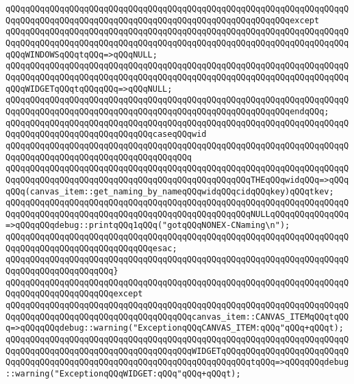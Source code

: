 \verb|qQQqqQQqqQQqqQQqqQQqqQQqqQQqqQQqqQQqqQQqqQQqqQQqqQQqqQQqqQQqqQQqqQQqqQQqqQQqqQQqqQQqqQQqqQQqqQQqqQQqqQQqqQQqqQQqqQQqqQQqqQQqqQQqexcept|\newline
\verb|qQQqqQQqqQQqqQQqqQQqqQQqqQQqqQQqqQQqqQQqqQQqqQQqqQQqqQQqqQQqqQQqqQQqqQQqqQQqqQQqqQQqqQQqqQQqqQQqqQQqqQQqqQQqqQQqqQQqqQQqqQQqqQQqqQQqqQQqqQQqqQQqWINDOWSqQQqtqQQq=>qQQqNULL;|\newline
\verb|qQQqqQQqqQQqqQQqqQQqqQQqqQQqqQQqqQQqqQQqqQQqqQQqqQQqqQQqqQQqqQQqqQQqqQQqqQQqqQQqqQQqqQQqqQQqqQQqqQQqqQQqqQQqqQQqqQQqqQQqqQQqqQQqqQQqqQQqqQQqqQQqWIDGETqQQqtqQQqqQQq=>qQQqNULL;|\newline
\verb|qQQqqQQqqQQqqQQqqQQqqQQqqQQqqQQqqQQqqQQqqQQqqQQqqQQqqQQqqQQqqQQqqQQqqQQqqQQqqQQqqQQqqQQqqQQqqQQqqQQqqQQqqQQqqQQqqQQqqQQqqQQqqQQqendqQQq;|\newline
\verb|qQQqqQQqqQQqqQQqqQQqqQQqqQQqqQQqqQQqqQQqqQQqqQQqqQQqqQQqqQQqqQQqqQQqqQQqqQQqqQQqqQQqqQQqqQQqqQQqqQQqcaseqQQqwid|\newline
\verb|qQQqqQQqqQQqqQQqqQQqqQQqqQQqqQQqqQQqqQQqqQQqqQQqqQQqqQQqqQQqqQQqqQQqqQQqqQQqqQQqqQQqqQQqqQQqqQQqqQQqqQQqqQQq|\newline
\verb|qQQqqQQqqQQqqQQqqQQqqQQqqQQqqQQqqQQqqQQqqQQqqQQqqQQqqQQqqQQqqQQqqQQqqQQqqQQqqQQqqQQqqQQqqQQqqQQqqQQqqQQqqQQqqQQqqQQqqQQqTHEqQQqwidqQQq=>qQQqqQQq(canvas_item::get_naming_by_nameqQQqwidqQQqcidqQQqkey)qQQqtkev;|\newline
\verb|qQQqqQQqqQQqqQQqqQQqqQQqqQQqqQQqqQQqqQQqqQQqqQQqqQQqqQQqqQQqqQQqqQQqqQQqqQQqqQQqqQQqqQQqqQQqqQQqqQQqqQQqqQQqqQQqqQQqqQQqNULLqQQqqQQqqQQqqQQq=>qQQqqQQqdebug::printqQQq1qQQq("gotqQQqNONEX-CNaming\n");|\newline
\verb|qQQqqQQqqQQqqQQqqQQqqQQqqQQqqQQqqQQqqQQqqQQqqQQqqQQqqQQqqQQqqQQqqQQqqQQqqQQqqQQqqQQqqQQqqQQqqQQqqQQqesac;|\newline
\verb|qQQqqQQqqQQqqQQqqQQqqQQqqQQqqQQqqQQqqQQqqQQqqQQqqQQqqQQqqQQqqQQqqQQqqQQqqQQqqQQqqQQqqQQqqQQq}|\newline
\verb|qQQqqQQqqQQqqQQqqQQqqQQqqQQqqQQqqQQqqQQqqQQqqQQqqQQqqQQqqQQqqQQqqQQqqQQqqQQqqQQqqQQqqQQqqQQqexcept|\newline
\verb|qQQqqQQqqQQqqQQqqQQqqQQqqQQqqQQqqQQqqQQqqQQqqQQqqQQqqQQqqQQqqQQqqQQqqQQqqQQqqQQqqQQqqQQqqQQqqQQqqQQqqQQqqQQqcanvas_item::CANVAS_ITEMqQQqtqQQq=>qQQqqQQqdebug::warning("ExceptionqQQqCANVAS_ITEM:qQQq"qQQq+qQQqt);|\newline
\verb|qQQqqQQqqQQqqQQqqQQqqQQqqQQqqQQqqQQqqQQqqQQqqQQqqQQqqQQqqQQqqQQqqQQqqQQqqQQqqQQqqQQqqQQqqQQqqQQqqQQqqQQqqQQqWIDGETqQQqqQQqqQQqqQQqqQQqqQQqqQQqqQQqqQQqqQQqqQQqqQQqqQQqqQQqqQQqqQQqqQQqqQQqqQQqtqQQq=>qQQqqQQqdebug::warning("ExceptionqQQqWIDGET:qQQq"qQQq+qQQqt);|\newline
